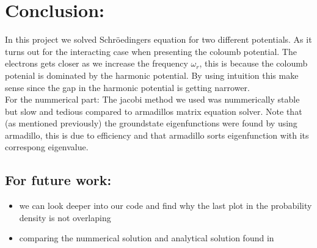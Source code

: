 \documentclass[a4paper, 10pt]{article}
\begin{document}
\section{Conclusion:} In this project we solved Schröedingers equation for two different
potentials. As it turns out for the interacting case when presenting the coloumb potential.
The electrons gets closer as we increase the frequency $\omega_{r}$, this is because
the coloumb potenial is dominated by the harmonic potential. By using intuition this make sense
since the gap in the harmonic potential is getting narrower.
\vspace{3mm}
\\
For the nummerical part: The jacobi method we used was nummerically stable but slow and tedious compared to
armadillos matrix equation solver. Note that (as mentioned previously) the groundstate eigenfunctions
were found by using armadillo, this is due to efficiency and that armadillo sorts eigenfunction with its
correspong eigenvalue.
\subsection{For future work:}
\begin{itemize}
  \item we can look deeper into our code and find why the last plot
  in the probability density is not overlaping
  \item comparing the nummerical solution and analytical solution found in \cite{taut}
\end{itemize}

\newpage


\end{document}
